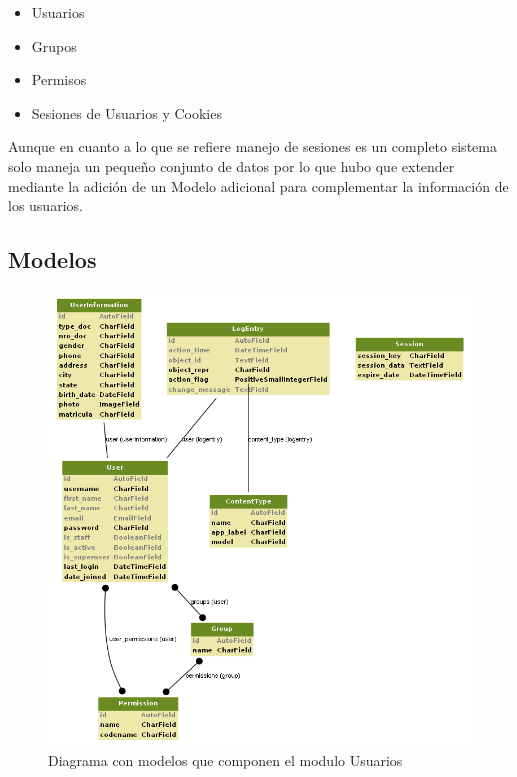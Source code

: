\begin{itemize}
    \item Usuarios
    \item Grupos
    \item Permisos
    \item Sesiones de Usuarios y Cookies
\end{itemize}

Aunque en cuanto a lo que se refiere manejo de sesiones es un completo sistema solo maneja un pequeño conjunto de datos por lo que hubo que extender mediante la adición de un Modelo adicional para complementar la información de los usuarios.


\subsection{Modelos}

\begin{figure}[H]
    \centering
    \includegraphics[scale=0.6]{resourse/auth.png}
    \caption{Diagrama con modelos que componen el modulo Usuarios}
    \label{fig:07}
\end{figure}


